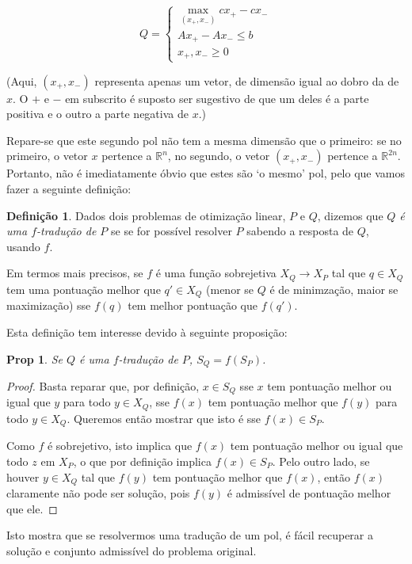 \documentclass{article}
\newcommand{\R}{\mathbb{R}}
\newtheorem{prop}{Prop}
\theoremstyle{definition}
\newtheorem{definition}{Definição}
\begin{document}
	\[
	Q =
	\begin{cases}
	\max\limits_{(x_+, x_-)} cx_+ - cx_-\\
	Ax_+ - Ax_- \leq b\\
	x_+, x_- \geq 0
	\end{cases}
	\]
	
	(Aqui, $(x_+,x_-)$ representa apenas um vetor, de dimensão igual ao dobro da de $x$. O $+$ e $-$ em subscrito é suposto ser sugestivo de que um deles é a parte positiva e o outro a parte negativa de $x$.)
	
	Repare-se que este segundo pol não tem a mesma dimensão que o primeiro: se no primeiro, o vetor $x$ pertence a $\R^n$, no segundo, o vetor $(x_+, x_-)$ pertence a $\R^{2n}$. Portanto, não é imediatamente óbvio que estes são `o mesmo' pol, pelo que vamos fazer a seguinte definição:
	
	\begin{definition}
	Dados dois problemas de otimização linear, $P$ e $Q$, dizemos que \emph{$Q$ é uma $f$-tradução de $P$} se se for possível resolver $P$ sabendo a resposta de $Q$, usando $f$.
	
	Em termos mais precisos, se $f$ é uma função sobrejetiva $X_Q \rightarrow X_P$ tal que $q \in X_Q$ tem uma pontuação melhor que $q' \in X_Q$ (menor se $Q$ é de minimzação, maior se maximização) sse $f(q)$ tem melhor pontuação que $f(q')$.
	\end{definition}
	
	Esta definição tem interesse devido à seguinte proposição:
	
	\begin{prop}
	Se $Q$ é uma $f$-tradução de $P$, $S_Q = f(S_P)$.
	\end{prop}
	\begin{proof}
	Basta reparar que, por definição, $x \in S_Q$ sse $x$ tem pontuação melhor ou igual que $y$ para todo $y \in X_Q$, sse $f(x)$ tem pontuação melhor que $f(y)$ para todo $y \in X_Q$. Queremos então mostrar que isto é sse $f(x) \in S_P$.
	
	Como $f$ é sobrejetivo, isto implica que $f(x)$ tem pontuação melhor ou igual que todo $z$ em $X_P$, o que por definição implica $f(x) \in S_P$. Pelo outro lado, se houver $y \in X_Q$ tal que $f(y)$ tem pontuação melhor que $f(x)$, então $f(x)$ claramente não pode ser solução, pois $f(y)$ é admissível de pontuação melhor que ele.
	\end{proof}
	
	Isto mostra que se resolvermos uma tradução de um pol, é fácil recuperar a solução e conjunto admissível do problema original.
	
\end{document}
